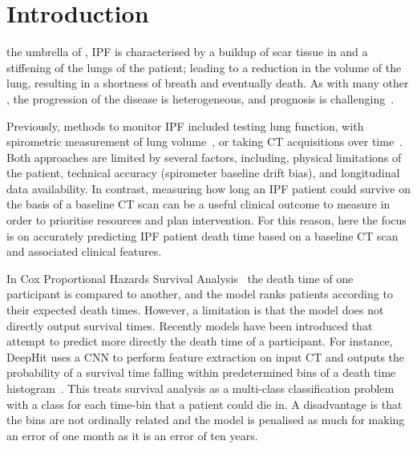 \vspace{-0.75cm}

\section{Introduction} \label{sec:introduction}
     the umbrella of , \gls{IPF} is  characterised by a buildup of scar tissue in and a stiffening of the lungs of the patient; leading to a reduction in the volume of the lung, resulting in a shortness of breath and eventually death. As with many other , the progression of the disease is heterogeneous, and prognosis is challenging~\cite{King2011IdiopathicFibrosis}.
    
    Previously, methods to monitor \gls{IPF} included testing lung function, with spirometric measurement of lung volume~\cite{Watters1986AFibrosis}, or taking \gls{CT} acquisitions over time~\cite{Lynch2018DiagnosticPaper}. Both approaches are limited by several factors, including, physical limitations of the patient, technical accuracy (spirometer baseline drift bias), and  longitudinal data availability. In contrast, measuring how long an \gls{IPF} patient could survive on the basis of a baseline \gls{CT} scan can be a useful clinical outcome to measure in order to prioritise resources and plan intervention. %
    For this reason, here the focus is on accurately predicting \gls{IPF} patient death time based on a baseline \gls{CT} scan and associated clinical features.

    In Cox Proportional Hazards Survival Analysis~\cite{Cox1972RegressionLife-Tables} the death time of one participant is compared to another, and the model ranks patients according to their expected death times. However, a limitation is that the model does not directly output survival times. Recently models have been introduced that attempt to predict more directly the death time of a participant. For instance, DeepHit uses a \gls{CNN} to perform feature extraction on input \gls{CT} and outputs the probability of a survival time falling within predetermined bins of a death time histogram~\cite{Lee2018DeepHit:Risks}. This treats survival analysis as a multi-class classification problem with a class for each time-bin that a patient could die in. A disadvantage is that the bins are not ordinally related and the model is penalised as much for making an error of one month as it is an error of ten years.

